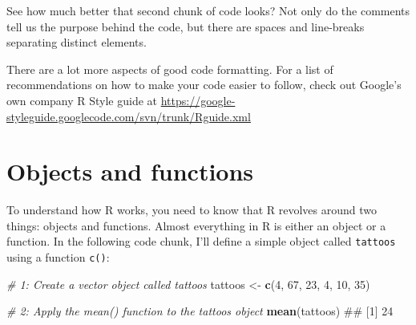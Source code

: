 \documentclass[]{book}
\newenvironment{Shaded}{\begin{snugshade}}{\end{snugshade}}
\newcommand{\KeywordTok}[1]{\textcolor[rgb]{0.13,0.29,0.53}{\textbf{#1}}}
\newcommand{\DataTypeTok}[1]{\textcolor[rgb]{0.13,0.29,0.53}{#1}}
\newcommand{\DecValTok}[1]{\textcolor[rgb]{0.00,0.00,0.81}{#1}}
\newcommand{\FloatTok}[1]{\textcolor[rgb]{0.00,0.00,0.81}{#1}}
\newcommand{\StringTok}[1]{\textcolor[rgb]{0.31,0.60,0.02}{#1}}
\newcommand{\CommentTok}[1]{\textcolor[rgb]{0.56,0.35,0.01}{\textit{#1}}}
\newcommand{\OperatorTok}[1]{\textcolor[rgb]{0.81,0.36,0.00}{\textbf{#1}}}
\newcommand{\NormalTok}[1]{#1}
\theoremstyle{definition}
\theoremstyle{definition}
\theoremstyle{remark}
\begin{document}
\begin{Shaded}
\end{Shaded}

See how much better that second chunk of code looks? Not only do the
comments tell us the purpose behind the code, but there are spaces and
line-breaks separating distinct elements.

There are a lot more aspects of good code formatting. For a list of
recommendations on how to make your code easier to follow, check out
Google's own company R Style guide at
\url{https://google-styleguide.googlecode.com/svn/trunk/Rguide.xml}

\section{Objects and functions}\label{objects-and-functions}

To understand how R works, you need to know that R revolves around two
things: objects and functions. Almost everything in R is either an
object or a function. In the following code chunk, I'll define a simple
object called \texttt{tattoos} using a function \texttt{c()}:

\begin{Shaded}
\begin{Highlighting}[]
\CommentTok{# 1: Create a vector object called tattoos}
\NormalTok{tattoos <-}\StringTok{ }\KeywordTok{c}\NormalTok{(}\DecValTok{4}\NormalTok{, }\DecValTok{67}\NormalTok{, }\DecValTok{23}\NormalTok{, }\DecValTok{4}\NormalTok{, }\DecValTok{10}\NormalTok{, }\DecValTok{35}\NormalTok{)}

\CommentTok{# 2: Apply the mean() function to the tattoos object}
\KeywordTok{mean}\NormalTok{(tattoos)}
\NormalTok{## [1] 24}
\end{Highlighting}
\end{Shaded}
\end{document}
